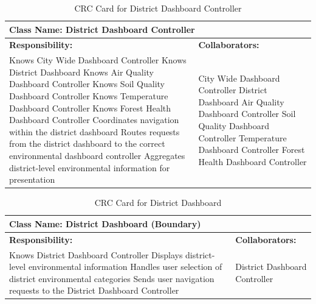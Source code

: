 \documentclass[]{article}
\begin{document}
\begin{table}[H]	
    \centering
    \caption{CRC Card for District Dashboard Controller}
    \vspace{1mm}
    \begin{tabular}{|p{7.5cm}|p{7.5cm}|}
    \hline 
    \multicolumn{2}{|l|}{\textbf{Class Name: District Dashboard Controller}} \\
    \hline
    \textbf{Responsibility:} & \textbf{Collaborators:} \\
    \hline
        Knows City Wide Dashboard Controller \newline
        Knows District Dashboard \newline
        Knows Air Quality Dashboard Controller \newline
        Knows Soil Quality Dashboard Controller \newline
        Knows Temperature Dashboard Controller \newline
        Knows Forest Health Dashboard Controller \newline
        Coordinates navigation within the district dashboard \newline
        Routes requests from the district dashboard to the correct environmental dashboard controller \newline
        Aggregates district-level environmental information for presentation \newline
        &
        City Wide Dashboard Controller \newline
        District Dashboard \newline
        Air Quality Dashboard Controller \newline
        Soil Quality Dashboard Controller \newline
        Temperature Dashboard Controller \newline
        Forest Health Dashboard Controller \\
    \hline
    \end{tabular}
\end{table} 
\begin{table}[H]
    \centering
    \caption{CRC Card for District Dashboard}
    \vspace{1mm}
    \begin{tabular}{|p{7.5cm}|p{7.5cm}|}
    \hline 
    \multicolumn{2}{|l|}{\textbf{Class Name: District Dashboard (Boundary)}} \\
    \hline
    \textbf{Responsibility:} & \textbf{Collaborators:} \\
    \hline
        Knows District Dashboard Controller \newline
        Displays district-level environmental information \newline
        Handles user selection of district environmental categories \newline
        Sends user navigation requests to the District Dashboard Controller \newline
        &
        District Dashboard Controller \\
    \hline
    \end{tabular}
\end{table}
\end{document}
